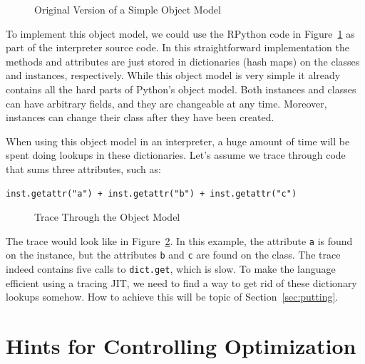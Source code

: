 \documentclass{sigplanconf}
\begin{document}
\begin{figure}

\caption{Original Version of a Simple Object Model}
\label{fig:interpreter-slow}
\end{figure}


To implement this object model, we could use the RPython code in
Figure~\ref{fig:interpreter-slow} as part of the interpreter source code.
In this straightforward implementation the methods and attributes are just
stored in dictionaries (hash maps) on the classes and instances, respectively.
While this object model is very
simple it already contains all the hard parts of Python's object model. Both
instances and classes can have arbitrary fields, and they are changeable at
any time.  Moreover, instances can change their class after they have been
created.

When using this object model in
an interpreter, a huge amount of time will be spent doing lookups in these
dictionaries.
Let's assume we trace through code that sums three attributes, such as:

\begin{lstlisting}[mathescape,basicstyle=\ttfamily]
inst.getattr("a") + inst.getattr("b") + inst.getattr("c")
\end{lstlisting}

\begin{figure}

\caption{Trace Through the Object Model}
\label{fig:trace1}
\end{figure}

The trace would look like in Figure~\ref{fig:trace1}. In this example, the
attribute \texttt{a} is found on the instance, but the
attributes \texttt{b} and \texttt{c} are found on the class. The trace indeed contains
five calls to \texttt{dict.get}, which is slow. To make the language efficient
using a tracing JIT, we need to find a way to get rid of these dictionary
lookups somehow. How to achieve this will be topic of
Section~\ref{sec:putting}.






\section{Hints for Controlling Optimization}
\label{sec:hints}
\end{document}
